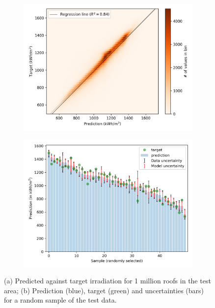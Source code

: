 \begin{figure}[tb]
\centering
\begin{subfigure}{.49\textwidth}
  \centering
  \includegraphics[width=\linewidth]{images/Figs/Regression_RF_1M.png}
  \subcaption{}
  \label{fig:chile_regr}
\end{subfigure}
\begin{subfigure}{.49\textwidth}
  \centering
  \includegraphics[width=\linewidth]{images/Figs/pred_uncertainty_irrad_tst_new.png}  
  \subcaption{}
  \label{fig:chile_ml_pred}
\end{subfigure}
\caption{(a) Predicted against target irradiation for 1 million roofs in the test area; (b) Prediction (blue), target (green) and uncertainties (bars) for a random sample of the test data.}
\end{figure}

